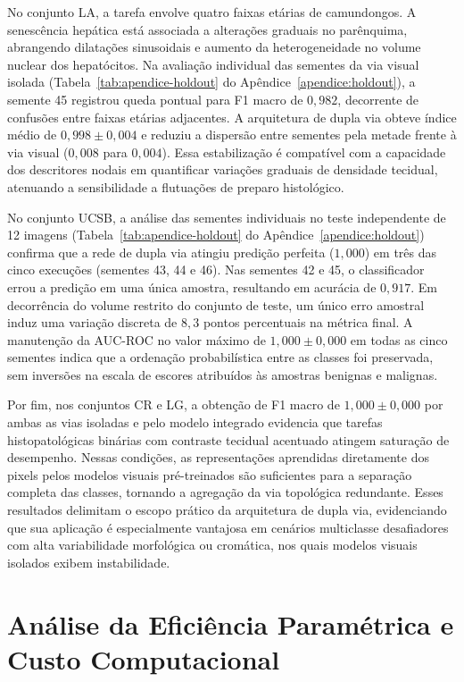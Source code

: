 No conjunto LA, a tarefa envolve quatro faixas etárias de camundongos. A senescência hepática está associada a alterações graduais no parênquima, abrangendo dilatações sinusoidais e aumento da heterogeneidade no volume nuclear dos hepatócitos. Na avaliação individual das sementes da via visual isolada (Tabela~\ref{tab:apendice-holdout} do Apêndice~\ref{apendice:holdout}), a semente 45 registrou queda pontual para F1 macro de $0{,}982$, decorrente de confusões entre faixas etárias adjacentes. A arquitetura de dupla via obteve índice médio de $0{,}998 \pm 0{,}004$ e reduziu a dispersão entre sementes pela metade frente à via visual ($0{,}008$ para $0{,}004$). Essa estabilização é compatível com a capacidade dos descritores nodais em quantificar variações graduais de densidade tecidual, atenuando a sensibilidade a flutuações de preparo histológico.

No conjunto UCSB, a análise das sementes individuais no teste independente de 12 imagens (Tabela~\ref{tab:apendice-holdout} do Apêndice~\ref{apendice:holdout}) confirma que a rede de dupla via atingiu predição perfeita ($1{,}000$) em três das cinco execuções (sementes 43, 44 e 46). Nas sementes 42 e 45, o classificador errou a predição em uma única amostra, resultando em acurácia de $0{,}917$. Em decorrência do volume restrito do conjunto de teste, um único erro amostral induz uma variação discreta de $8{,}3$ pontos percentuais na métrica final. A manutenção da AUC-ROC no valor máximo de $1{,}000 \pm 0{,}000$ em todas as cinco sementes indica que a ordenação probabilística entre as classes foi preservada, sem inversões na escala de escores atribuídos às amostras benignas e malignas.

Por fim, nos conjuntos CR e LG, a obtenção de F1 macro de $1{,}000 \pm 0{,}000$ por ambas as vias isoladas e pelo modelo integrado evidencia que tarefas histopatológicas binárias com contraste tecidual acentuado atingem saturação de desempenho. Nessas condições, as representações aprendidas diretamente dos pixels pelos modelos visuais pré-treinados são suficientes para a separação completa das classes, tornando a agregação da via topológica redundante. Esses resultados delimitam o escopo prático da arquitetura de dupla via, evidenciando que sua aplicação é especialmente vantajosa em cenários multiclasse desafiadores com alta variabilidade morfológica ou cromática, nos quais modelos visuais isolados exibem instabilidade.

\section{Análise da Eficiência Paramétrica e Custo Computacional}
\label{sec:res-eficiencia}

